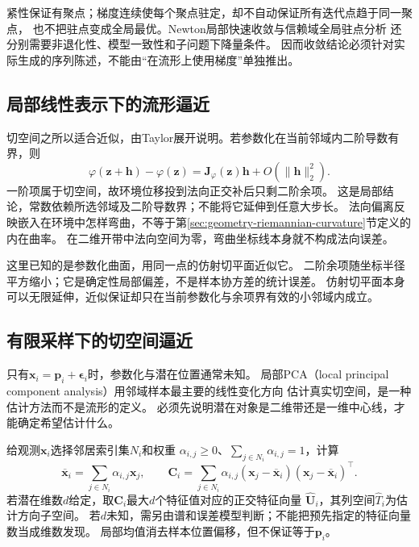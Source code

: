 紧性保证有聚点；梯度连续使每个聚点驻定，却不自动保证所有迭代点趋于同一聚点，
也不把驻点变成全局最优。Newton局部快速收敛与信赖域全局驻点分析
还分别需要非退化性、模型一致性和子问题下降量条件。
因而收敛结论必须针对实际生成的序列陈述，不能由“在流形上使用梯度”单独推出。

\subsection{局部线性表示下的流形逼近}
\label{sec:geometry-local-linear-approximation}

切空间之所以适合近似，由Taylor展开说明。若参数化在当前邻域内二阶导数有界，则
\begin{equation}
 \varphi(\bm z+\bm h)-\varphi(\bm z)
 =\bm J_\varphi(\bm z)\bm h+O(\lVert\bm h\rVert_2^2).
 \label{eq:geometry-manifold-local-taylor}
\end{equation}
一阶项属于切空间，故环境位移投到法向正交补后只剩二阶余项。
这是局部结论，常数依赖所选邻域及二阶导数界；不能将它延伸到任意大步长。
法向偏离反映嵌入在环境中怎样弯曲，不等于第\ref{sec:geometry-riemannian-curvature}节定义的内在曲率。
在二维开带中法向空间为零，弯曲坐标线本身就不构成法向误差。


这里已知的是参数化曲面，用同一点的仿射切平面近似它。
二阶余项随坐标半径平方缩小；它是确定性局部偏差，不是样本协方差的统计误差。
仿射切平面本身可以无限延伸，近似保证却只在当前参数化与余项界有效的小邻域内成立。

\subsection{有限采样下的切空间逼近}
\label{sec:geometry-sampled-local-linearization}

只有$\bm x_i=\bm p_i+\bm\epsilon_i$时，参数化与潜在位置通常未知。
局部PCA（local principal component analysis）用邻域样本最主要的线性变化方向
估计真实切空间，是一种估计方法而不是流形的定义。
必须先说明潜在对象是二维带还是一维中心线，才能确定希望估计什么。

给观测$\bm x_i$选择邻居索引集$N_i$和权重
$\alpha_{i,j}\geq0$、$\sum_{j\in N_i}\alpha_{i,j}=1$，计算
\begin{equation}
 \overline{\bm x}_i=\sum_{j\in N_i}\alpha_{i,j}\bm x_j,\qquad
 \bm C_i=\sum_{j\in N_i}\alpha_{i,j}
  (\bm x_j-\overline{\bm x}_i)(\bm x_j-\overline{\bm x}_i)^\top.
 \label{eq:geometry-local-weighted-covariance}
\end{equation}
若潜在维数$d$给定，取$\bm C_i$最大$d$个特征值对应的正交特征向量
$\widehat{\bm U}_i$，其列空间$\widehat T_i$为估计方向子空间。
若$d$未知，需另由谱和误差模型判断；不能把预先指定的特征向量数当成维数发现。
局部均值消去样本位置偏移，但不保证等于$\bm p_i$。

